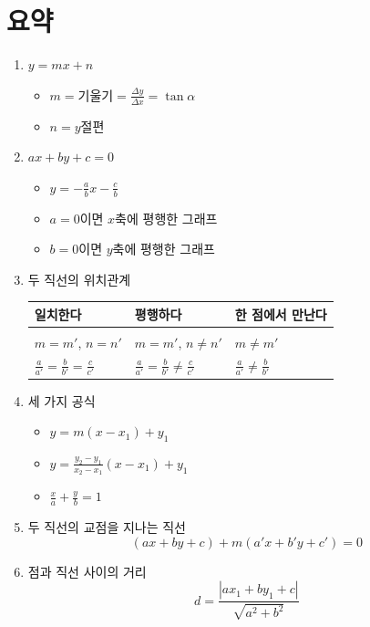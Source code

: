 \documentclass{oblivoir}
\begin{document}
\section*{요약}
\begin{enumerate}[label=\emph{\arabic*.},itemsep=10pt]
\item
\(y=mx+n\)
\begin{itemize}
\item
\(m=기울기=\frac{\Delta y}{\Delta x}=\tan\alpha\)
\item
\(n=y절편\)
\end{itemize}
\item
\(ax+by+c=0\)
\begin{itemize}
\item
\(y=-\frac abx-\frac cb\)
\item
\(a=0\)이면 \(x\)축에 평행한 그래프
\item
\(b=0\)이면 \(y\)축에 평행한 그래프
\end{itemize}
\item
두 직선의 위치관계\\[10pt]
\begin{tabu}to.8\textwidth{X[2,c]|X[2,c]|X[2,c]}
\toprule
일치한다	&평행하다	&한 점에서 만난다\\
\hline
&
&
\\\hline
\(m=m'\), \(n=n'\) & \(m=m'\), \(n\neq n'\) & \(m\neq m'\)
\\\hline
$\frac{a}{a'}=\frac{b}{b'}=\frac{c}{c'}$
 & $\frac{a}{a'}=\frac{b}{b'}\neq\frac{c}{c'}$
 & $\frac{a}{a'}\neq\frac{b}{b'}$
\\\bottomrule
\end{tabu}
\item
세 가지 공식
\begin{itemize}
\item
\(y=m(x-x_1)+y_1\)
\item
\(y=\frac{y_2-y_1}{x_2-x_1}(x-x_1)+y_1\)
\item
\(\frac xa+\frac yb=1\)
\end{itemize}
\item
두 직선의 교점을 지나는 직선
\[(ax+by+c)+m(a'x+b'y+c')=0\]
\item
점과 직선 사이의 거리
\[d=\frac{|ax_1+by_1+c|}{\sqrt{a^2+b^2}}\]
\end{enumerate}
\end{document}
